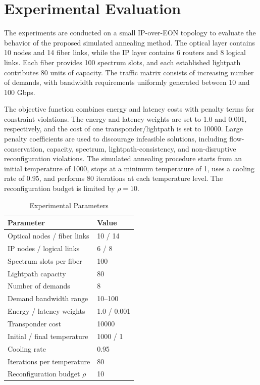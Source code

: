 \documentclass[conference]{IEEEtran}
\begin{document}
\section{Experimental Evaluation}
\label{sec:evaluation}

\noindent The experiments are conducted on a small IP-over-EON topology to evaluate the behavior of the proposed simulated annealing method. The optical layer contains 10 nodes and 14 fiber links, while the IP layer contains 6 routers and 8 logical links. Each fiber provides 100 spectrum slots, and each established lightpath contributes 80 units of capacity. The traffic matrix consists of increasing number of demands, with bandwidth requirements uniformly generated between 10 and 100 Gbps.

The objective function combines energy and latency costs with penalty terms for constraint violations. The energy and latency weights are set to 1.0 and 0.001, respectively, and the cost of one transponder/lightpath is set to 10000. Large penalty coefficients are used to discourage infeasible solutions, including flow-conservation, capacity, spectrum, lightpath-consistency, and non-disruptive reconfiguration violations. The simulated annealing procedure starts from an initial temperature of 1000, stops at a minimum temperature of 1, uses a cooling rate of 0.95, and performs 80 iterations at each temperature level. The reconfiguration budget is limited by $\rho = 10$.

\begin{table}[t]
\centering
\caption{Experimental Parameters}
\label{tab:experimental-parameters}
\begin{tabular}{@{}ll@{}}
\toprule
\textbf{Parameter} & \textbf{Value} \\
\midrule
Optical nodes / fiber links & 10 / 14 \\
IP nodes / logical links & 6 / 8 \\
Spectrum slots per fiber & 100 \\
Lightpath capacity & 80 \\
Number of demands & 8 \\
Demand bandwidth range & 10--100 \\
Energy / latency weights & 1.0 / 0.001 \\
Transponder cost & 10000 \\
Initial / final temperature & 1000 / 1 \\
Cooling rate & 0.95 \\
Iterations per temperature & 80 \\
Reconfiguration budget $\rho$ & 10 \\
\bottomrule
\end{tabular}
\end{table}
\end{document}

